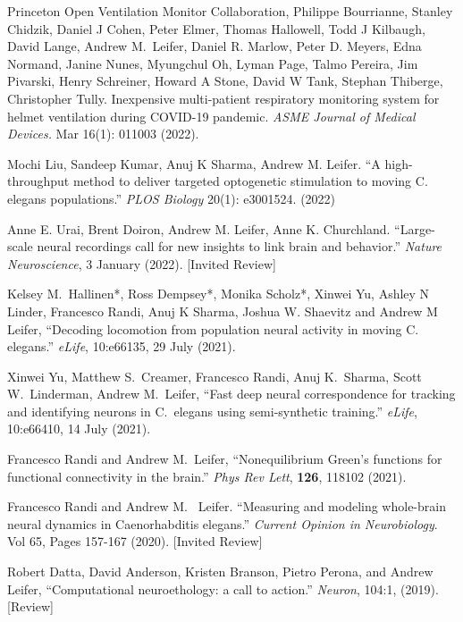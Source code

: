 \documentclass[11pt]{article}
\makeatletter
\newlength{\bibhang}
\newlength{\bibsep}
\newcounter{Lcount}
 {\@listi \global\bibsep\itemsep \global\advance\bibsep by\parsep}
\newenvironment{bibsection}%
        {\begin{list}{\arabic{Lcount}.}{%
       \usecounter{Lcount}%
       \setlength\labelwidth{-0.5em}%
       \setlength{\leftmargin}{\bibhang}%
       \setlength{\itemindent}{-\leftmargin}%
       \setlength{\itemsep}{\bibsep}%
       \setlength{\parsep}{\z@}%
        \setlength{\partopsep}{0pt}%
        \setlength{\topsep}{0pt}}}
        {\end{list}\vspace{-.6\baselineskip}}
\makeatother
\begin{document}
\begin{bibsection}
\item Princeton Open Ventilation Monitor Collaboration, Philippe Bourrianne, Stanley Chidzik, Daniel J Cohen, Peter Elmer, Thomas Hallowell, Todd J Kilbaugh, David Lange, Andrew M.~Leifer, Daniel R. Marlow, Peter D. Meyers, Edna Normand, Janine Nunes, Myungchul Oh, Lyman Page, Talmo Pereira, Jim Pivarski, Henry Schreiner, Howard A Stone, David W Tank, Stephan Thiberge, Christopher Tully.  Inexpensive multi-patient respiratory monitoring system for helmet ventilation during COVID-19 pandemic. \textit{ASME Journal of Medical Devices.}  Mar 16(1): 011003 (2022).

\item Mochi Liu, Sandeep Kumar, Anuj K Sharma, Andrew M. Leifer. ``A high-throughput method to deliver targeted optogenetic stimulation to moving C. elegans populations.'' \textit{PLOS Biology} 20(1): e3001524. (2022)



\item Anne E. Urai, Brent Doiron, Andrew M. Leifer, Anne K. Churchland. ``Large-scale neural recordings call for new insights to link brain and behavior.'' \textit{Nature Neuroscience}, 3 January (2022). [Invited Review]


\item Kelsey M.~Hallinen*, Ross Dempsey*, Monika Scholz*, Xinwei Yu, Ashley N Linder, Francesco Randi, Anuj K Sharma, Joshua W. Shaevitz and Andrew M Leifer, ``Decoding locomotion from population neural activity in moving C. elegans.'' \emph{eLife}, 10:e66135, 29 July (2021).

\item Xinwei Yu, Matthew S.~Creamer, Francesco Randi, Anuj K.~Sharma, Scott W.~Linderman, Andrew M.~Leifer, ``Fast deep neural correspondence for  tracking and identifying neurons in C.~elegans using semi-synthetic training.'' \emph{eLife}, 10:e66410, 14 July (2021).

\item Francesco Randi and Andrew M.~Leifer, ``Nonequilibrium Green's functions for functional connectivity in the brain.'' \emph{Phys Rev Lett}, \textbf{126}, 118102 (2021).

\item Francesco Randi and Andrew M.~ Leifer. ``Measuring and modeling whole-brain neural dynamics in Caenorhabditis elegans.'' \emph{Current Opinion in Neurobiology}. Vol 65, Pages 157-167 (2020). [Invited Review]

\item Robert Datta, David Anderson, Kristen Branson, Pietro Perona, and Andrew Leifer, ``Computational neuroethology: a call to action.'' \emph{Neuron}, 104:1, (2019). [Review]


\end{bibsection}
\end{document}

